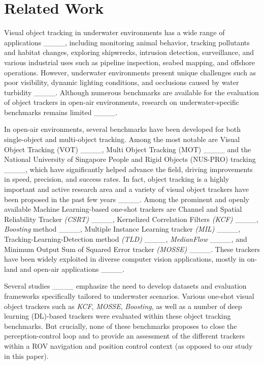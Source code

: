 \section{Related Work}
\label{related}
Visual object tracking in underwater environments has a wide range of applications ____, including monitoring animal behavior, tracking pollutants and habitat changes, exploring shipwrecks, intrusion detection, surveillance, and various industrial uses such as pipeline inspection, seabed mapping, and offshore operations. However, underwater environments present unique challenges such as poor visibility, dynamic lighting conditions, and occlusions caused by water turbidity ____. Although numerous benchmarks are available for the evaluation of object trackers in open-air environments, research on underwater-specific benchmarks remains limited ____.

In open-air environments, several benchmarks have been developed for both single-object and multi-object tracking. Among the most notable are Visual Object Tracking (VOT) ____, Multi Object Tracking (MOT) ____ and the National University of Singapore People and Rigid Objects (NUS-PRO) tracking ____, which have significantly helped advance the field, driving improvements in speed, precision, and success rates. In fact, object tracking is a highly important and active research area and a variety of visual object trackers have been proposed in the past few years ____. Among the prominent and openly available Machine Learning-based one-shot trackers are Channel and Spatial Reliability Tracker \textit{(CSRT)} ____, Kernelized Correlation Filters \textit{(KCF)} ____, \textit{Boosting} method ____, Multiple Instance Learning tracker \textit{(MIL)} ____, Tracking-Learning-Detection method \textit{(TLD)} ____, \textit{MedianFlow} ____, and Minimum Output Sum of Squared Error tracker \textit{(MOSSE)} ____. These trackers have been widely exploited in diverse computer vision applications, mostly in on-land and open-air applications ____.%

Several studies ____ emphasize the need to develop datasets and evaluation frameworks specifically tailored to underwater scenarios. Various one-shot visual object trackers such as \textit{KCF}, \textit{MOSSE}, \textit{Boosting}, as well as a number of deep learning (DL)-based trackers were evaluated within these object tracking benchmarks. But crucially, none of these benchmarks proposes to close the perception-control loop and to provide an assessment of the different trackers within a ROV navigation and position control context (as opposed to our study in this paper).


